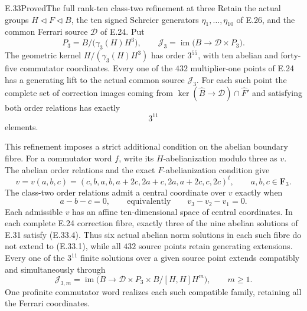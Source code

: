 \begin{statement}{E.33}{Proved}{The full rank-ten class-two refinement at three}
Retain the actual groups $H\triangleleft F\triangleleft B$,
the ten signed Schreier generators $\eta_1,\ldots,\eta_{10}$
of E.26, and the common Ferrari source $\mathscr D$ of E.24.
Put
\[
 P_3=B/\bigl(\gamma_3(H)H^3\bigr),\qquad
 \mathscr J_3=\operatorname{im}
       \bigl(B\longrightarrow\mathscr D\times P_3\bigr).
 \tag{E.33.1}
\]
The geometric kernel $H/(\gamma_3(H)H^3)$ has order $3^{55}$,
with ten abelian and forty-five commutator coordinates.
Every one of the $432$ multiplier-one points of E.24 has
a generating lift to the actual common source $\mathscr J_3$.
For each such point the complete set of correction images
coming from $\ker(\widehat B\to\mathscr D)\cap\widehat F'$
and satisfying both order relations has exactly
\[
                         3^{11}
 \tag{E.33.2}
\]
elements.

This refinement imposes a strict additional condition on
the abelian boundary fibre.  For a commutator word $f$,
write its $H$-abelianization modulo three as $v$.
The abelian order relations and the exact $F$-abelianization
condition give
\[
 v=v(a,b,c)=
 (c,b,a,b,a+2c,2a+c,2a,a+2c,c,2c)^t,
       \qquad a,b,c\in\mathbf F_3.
 \tag{E.33.3}
\]
The class-two order relations admit a central coordinate
over $v$ exactly when
\[
                       a-b-c=0,
 \qquad\text{equivalently}\qquad v_3-v_2-v_1=0.
 \tag{E.33.4}
\]
Each admissible $v$ has an affine ten-dimensional space of
central coordinates.  In each complete E.24 correction fibre,
exactly three of the nine abelian solutions of E.31 satisfy
\textup{(E.33.4)}.  Thus six actual abelian norm solutions in
each such fibre do not extend to \textup{(E.33.1)}, while all
$432$ source points retain generating extensions.
Every one of the $3^{11}$ finite solutions over a given
source point extends compatibly and simultaneously through
\[
 \mathscr J_{3,m}=
 \operatorname{im}\bigl(
 B\longrightarrow
 \mathscr D\times P_3\times B/[H,H]H^m\bigr),
                    \qquad m\ge1.
 \tag{E.33.17}
\]
One profinite commutator word realizes each such compatible
family, retaining all the Ferrari coordinates.
\end{statement}
